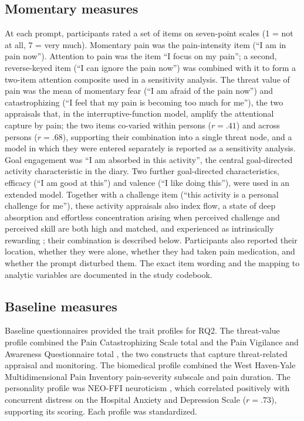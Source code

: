 \documentclass[11pt,a4paper]{article}
\begin{document}
\subsection{Momentary measures}
At each prompt, participants rated a set of items on seven-point scales (1 = not at all,
7 = very much). Momentary pain was the pain-intensity item (``I am in pain now''). Attention to
pain was the item ``I focus on my pain''; a second, reverse-keyed item (``I can ignore the pain
now'') was combined with it to form a two-item attention composite used in a sensitivity
analysis. The threat value of pain was the mean of momentary fear (``I am afraid of the pain
now'') and catastrophizing (``I feel that my pain is becoming too much for me''), the two
appraisals that, in the interruptive-function model, amplify the attentional capture by pain; the
two items co-varied within persons ($r=.41$) and across persons ($r=.68$), supporting their
combination into a single threat node, and a model in which they were entered separately is
reported as a sensitivity analysis. Goal engagement was ``I am absorbed in this activity'', the
central goal-directed activity characteristic in the diary. Two further goal-directed
characteristics, efficacy (``I am good at this'') and valence (``I like doing this''), were used
in an extended model. Together with a challenge item (``this activity is a personal challenge for
me''), these activity appraisals also index flow, a state of deep absorption and effortless
concentration arising when perceived challenge and perceived skill are both high and matched, and
experienced as intrinsically rewarding \citep{csikszentmihalyi1990flow,nakamura2014flow}; their
combination is described below. Participants also reported their location, whether they were alone, whether
they had taken pain medication, and whether the prompt disturbed them. The exact item wording and
the mapping to analytic variables are documented in the study codebook.

\subsection{Baseline measures}
Baseline questionnaires provided the trait profiles for RQ2. The threat-value profile combined
the Pain Catastrophizing Scale total \citep{sullivan1995pain} and the Pain Vigilance and
Awareness Questionnaire total \citep{roelofs2003pvaq}, the two constructs that capture
threat-related appraisal and monitoring. The biomedical profile combined the West
Haven-Yale Multidimensional Pain Inventory pain-severity subscale \citep{kerns1985mpi} and pain
duration. The personality profile was NEO-FFI neuroticism \citep{costa1992neo}, which correlated
positively with concurrent distress on the Hospital Anxiety and Depression Scale ($r=.73$),
supporting its scoring. Each profile was standardized.
\end{document}
